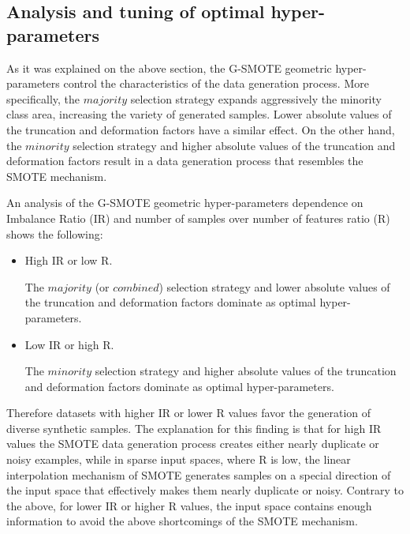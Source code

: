 \documentclass[parskip=full]{scrartcl}
\begin{document}
\subsection{Analysis and tuning of optimal hyper-parameters}

As it was explained on the above section, the G-SMOTE geometric
hyper-parameters control the characteristics of the data generation process.
More specifically, the \( majority \) selection strategy expands aggressively
the minority class area, increasing the variety of generated samples. Lower 
absolute values of the truncation and deformation factors have a similar effect. On
the other hand, the \( minority \) selection strategy and higher absolute values
of the truncation and deformation factors result in a data generation process
that resembles the SMOTE mechanism. 

An analysis of the G-SMOTE geometric hyper-parameters dependence on Imbalance
Ratio (IR) and number of samples over number of features ratio (R) shows the
following: 

\begin{itemize}
	
	\renewcommand\labelitemi{--}

	\item High IR or low R.
	
	The \( majority \) (or \( combined \)) selection strategy and lower absolute
	values of the truncation and deformation factors dominate as optimal
	hyper-parameters.

	\item Low IR or high R. 
	
	The \( minority \) selection strategy and higher absolute values of the
	truncation and deformation factors dominate as optimal hyper-parameters.

\end{itemize}

Therefore datasets with higher IR or lower R values favor the generation of
diverse synthetic samples. The explanation for this finding is that for high IR
values the SMOTE data generation process creates either nearly duplicate or
noisy examples, while in sparse input spaces, where R is low, the linear
interpolation mechanism of SMOTE generates samples on a special direction of the
input space that effectively makes them nearly duplicate or noisy. Contrary to
the above, for lower IR or higher R values, the input space contains enough
information to avoid the above shortcomings of the SMOTE mechanism.
\end{document}
